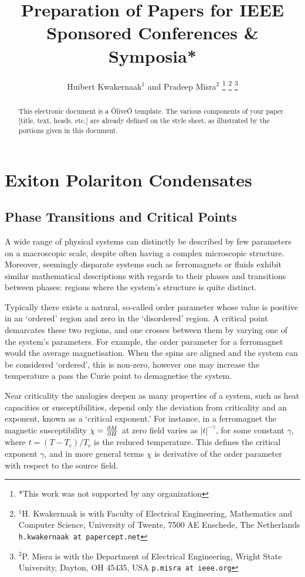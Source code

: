 \documentclass[letterpaper, 10 pt, conference]{IEEEtran}  %
\title{\LARGE \bf
Preparation of Papers for IEEE Sponsored Conferences \& Symposia*
}
\author{Huibert Kwakernaak$^{1}$ and Pradeep Misra$^{2}$%
\thanks{*This work was not supported by any organization}%
\thanks{$^{1}$H. Kwakernaak is with Faculty of Electrical Engineering, Mathematics and Computer Science,
        University of Twente, 7500 AE Enschede, The Netherlands
        {\tt\small h.kwakernaak at papercept.net}}%
\thanks{$^{2}$P. Misra is with the Department of Electrical Engineering, Wright State University,
        Dayton, OH 45435, USA
        {\tt\small p.misra at ieee.org}}%
}
\begin{document}
\maketitle
\thispagestyle{empty}
\pagestyle{empty}


\begin{abstract}

This electronic document is a ÒliveÓ template. The various components of your paper [title, text, heads, etc.] are already defined on the style sheet, as illustrated by the portions given in this document.

\end{abstract}


\section{Exiton Polariton Condensates}

\subsection{Phase Transitions and Critical Points}

A wide range of physical systems can distinctly be described by few parameters on a macroscopic scale, despite often having a complex microscopic structure. 
Moreover, seemingly disparate systems such as ferromagnets or fluids exhibit similar mathematical descriptions with regards to their phases and transitions between phases: regions where the system's structure is quite distinct. 

Typically there exists a natural, so-called order parameter whose value is positive in an `ordered' region and zero in the `disordered' region.
A critical point demarcates these two regions, and one crosses between them by varying one of the system's parameters. 
For example, the order parameter for a ferromagnet would the average magnetisation. When the spins are aligned and the system can be considered `ordered', this is non-zero, however one may increase the temperature a pass the Curie point to demagnetise the system.  

Near criticality the analogies deepen as many properties of a system, such as heat capacities or susceptibilities, depend only the deviation from criticality and an exponent, known as a `critical exponent.' 
For instance, in a ferromagnet the magnetic susceptibility $\chi= \pdv{M}{H}$ at zero field varies as $|t|^{-\gamma}$, for some constant $\gamma$, where $t = (T-T_c)/T_c$ is the reduced temperature. 
This defines the critical exponent $\gamma$, and in more general terms $\chi$ is derivative of the order parameter with respect to the source field. 
\end{document}
